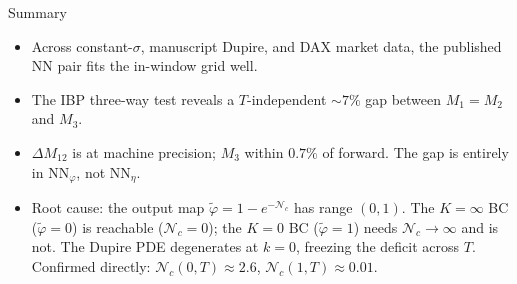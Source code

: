 \documentclass[aspectratio=169,11pt]{beamer}
\begin{document}
\begin{frame}{Summary}
    \begin{itemize}\setlength{\itemsep}{0.3em}
        \item Across constant-$\sigma$, manuscript Dupire, and DAX market data,
              the published NN pair fits the in-window grid well.
        \item The IBP three-way test reveals a $T$-independent $\sim\!7\%$ gap
              between $M_1\!=\!M_2$ and $M_3$.
        \item $\Delta M_{12}$ is at machine precision; $M_3$ within $0.7\%$ of forward.
              The gap is entirely in $\mathrm{NN}_\varphi$, not $\mathrm{NN}_\eta$.
        \item Root cause: the output map $\tilde\varphi=1-e^{-\mathcal{N}_c}$ has range $(0,1)$.
              The $K\!=\!\infty$ BC ($\tilde\varphi\!=\!0$) is reachable ($\mathcal{N}_c\!=\!0$);
              the $K\!=\!0$ BC ($\tilde\varphi\!=\!1$) needs $\mathcal{N}_c\!\to\!\infty$ and is not.
              The Dupire PDE degenerates at $k\!=\!0$, freezing the deficit across $T$.
              Confirmed directly: $\mathcal{N}_c(0,T)\!\approx\!2.6$, $\mathcal{N}_c(1,T)\!\approx\!0.01$.
    \end{itemize}
\end{frame}
\end{document}
